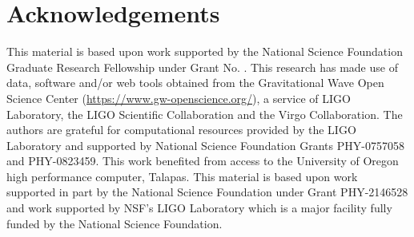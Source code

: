 \documentclass[twocolumn]{aastex631}
\newcommand{\jaxen}[1]{}
\begin{document}





\section{Acknowledgements}\label{sec:acknowledments}
This material is based upon work supported by the National Science Foundation Graduate Research Fellowship under Grant No. \jaxen{NUMBER}. This research has made use of data, software and/or web tools obtained from the Gravitational Wave Open Science Center 
(\url{https://www.gw-openscience.org/}), a service of LIGO Laboratory, the LIGO Scientific Collaboration and the Virgo Collaboration. 
The authors are grateful for computational resources provided by the LIGO Laboratory and supported by National Science Foundation Grants PHY-0757058 and PHY-0823459.  
This work benefited from access to the University of Oregon high performance computer, Talapas. This material is based upon work supported 
in part by the National Science Foundation under Grant PHY-2146528 and work supported by NSF's LIGO Laboratory which is a major facility 
fully funded by the National Science Foundation.
{}


\end{document}

